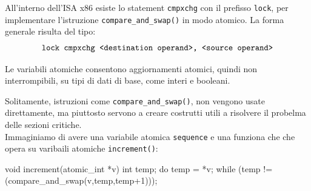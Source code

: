 All'interno dell'ISA x86 esiste lo statement \texttt{cmpxchg} con il prefisso \texttt{lock}, per implementare l'istruzione \texttt{compare\_and\_swap()} in modo atomico.
La forma generale risulta del tipo:
\[
  \text{\texttt{lock cmpxchg <destination operand>, <source operand>}}
\]
\begin{defn}
Le variabili atomiche consentono aggiornamenti atomici, quindi non interrompibili, su tipi di dati di base, come interi e booleani.
\end{defn}
Solitamente, istruzioni come \texttt{compare\_and\_swap()}, non vengono usate direttamente, ma piuttosto servono a creare costrutti utili a risolvere il probelma delle sezioni critiche. \\
Immaginiamo di avere una variabile atomica \texttt{sequence} e una funziona che che opera su varibaili atomiche \texttt{increment()}:
\begin{clang}
void increment(atomic_int *v){
  int temp;
  do {
    temp = *v;
  } while (temp != (compare_and_swap(v,temp,temp+1)));
}
\end{clang}
